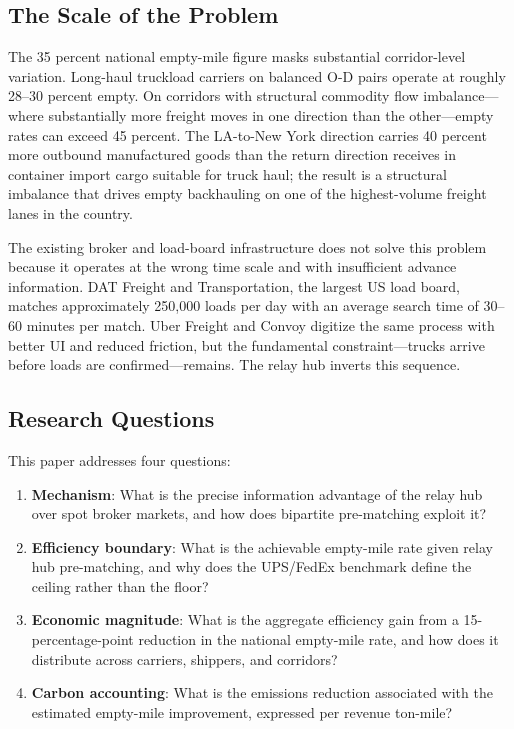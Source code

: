 \subsection{The Scale of the Problem}

The 35 percent national empty-mile figure \citep{ATRI_costs2024} masks substantial corridor-level variation. Long-haul truckload carriers on balanced O-D pairs operate at roughly 28--30 percent empty. On corridors with structural commodity flow imbalance---where substantially more freight moves in one direction than the other---empty rates can exceed 45 percent. The LA-to-New York direction carries 40 percent more outbound manufactured goods than the return direction receives in container import cargo suitable for truck haul; the result is a structural imbalance that drives empty backhauling on one of the highest-volume freight lanes in the country.

The existing broker and load-board infrastructure does not solve this problem because it operates at the wrong time scale and with insufficient advance information. DAT Freight and Transportation, the largest US load board, matches approximately 250,000 loads per day with an average search time of 30--60 minutes per match. Uber Freight and Convoy digitize the same process with better UI and reduced friction, but the fundamental constraint---trucks arrive before loads are confirmed---remains. The relay hub inverts this sequence.

\subsection{Research Questions}

This paper addresses four questions:

\begin{enumerate}
  \item \textbf{Mechanism}: What is the precise information advantage of the relay hub over spot broker markets, and how does bipartite pre-matching exploit it?
  \item \textbf{Efficiency boundary}: What is the achievable empty-mile rate given relay hub pre-matching, and why does the UPS/FedEx benchmark define the ceiling rather than the floor?
  \item \textbf{Economic magnitude}: What is the aggregate efficiency gain from a 15-percentage-point reduction in the national empty-mile rate, and how does it distribute across carriers, shippers, and corridors?
  \item \textbf{Carbon accounting}: What is the emissions reduction associated with the estimated empty-mile improvement, expressed per revenue ton-mile?
\end{enumerate}

